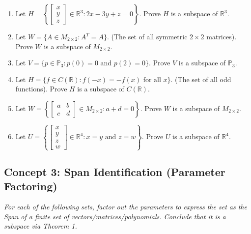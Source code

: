 \documentclass[11pt]{article}
\begin{document}
\begin{enumerate}[resume]
    \item Let $H = \left\{ \begin{bmatrix} x \\ y \\ z \end{bmatrix} \in \mathbb{R}^3 : 2x - 3y + z = 0 \right\}$. Prove $H$ is a subspace of $\mathbb{R}^3$.
    \item Let $W = \{A \in M_{2\times 2} : A^T = A\}$. (The set of all symmetric $2 \times 2$ matrices). Prove $W$ is a subspace of $M_{2\times 2}$.
    \item Let $V = \{p \in \mathbb{P}_3 : p(0) = 0 \text{ and } p(2) = 0\}$. Prove $V$ is a subspace of $\mathbb{P}_3$.
    \item Let $H = \{f \in C(\mathbb{R}) : f(-x) = -f(x) \text{ for all } x\}$. (The set of all odd functions). Prove $H$ is a subspace of $C(\mathbb{R})$.
    \item Let $W = \left\{ \begin{bmatrix} a & b \\ c & d \end{bmatrix} \in M_{2\times 2} : a+d = 0 \right\}$. Prove $W$ is a subspace of $M_{2\times 2}$.
    \item Let $U = \left\{ \begin{bmatrix} x \\ y \\ z \\ w \end{bmatrix} \in \mathbb{R}^4 : x=y \text{ and } z=w \right\}$. Prove $U$ is a subspace of $\mathbb{R}^4$.
\end{enumerate}

\subsection*{Concept 3: Span Identification (Parameter Factoring)}
\textit{For each of the following sets, factor out the parameters to express the set as the Span of a finite set of vectors/matrices/polynomials. Conclude that it is a subspace via Theorem 1.}
\end{document}

